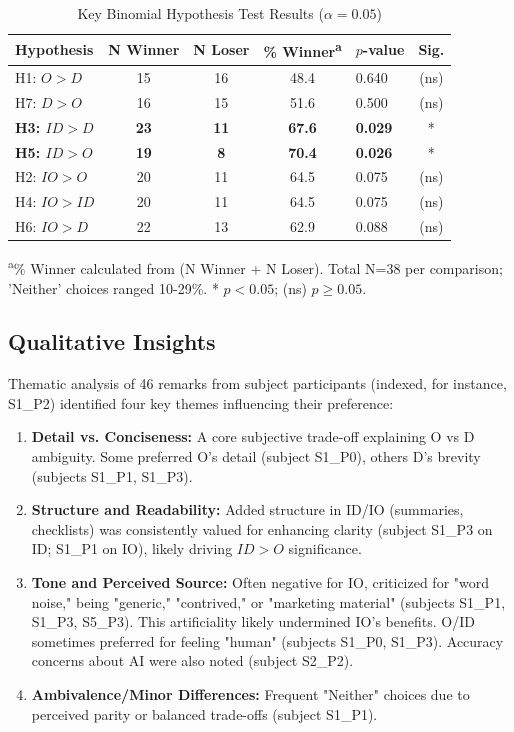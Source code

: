 \documentclass[conference]{IEEEtran}
\begin{document}
\begin{table}[htbp]
    \centering
    \caption{Key Binomial Hypothesis Test Results ($\alpha = 0.05$)}
    \label{tab:hypothesis_results_erv_refined}
    \begin{tabular}{l S[table-format=2.0] S[table-format=2.0] S[table-format=2.1] l c}
        \toprule
        Hypothesis & {N Winner} & {N Loser} & {\% Winner\textsuperscript{a}} & {$p$-value} & {Sig.} \\
        \midrule
        H1: $O > D$   & 15 & 16 & 48.4 & 0.640 & (ns) \\
        H7: $D > O$   & 16 & 15 & 51.6 & 0.500 & (ns) \\
        \textbf{H3: $ID > D$}  & \textbf{23} & \textbf{11} & \textbf{67.6} & \textbf{0.029} & * \\
        \textbf{H5: $ID > O$}  & \textbf{19} & \textbf{8}  & \textbf{70.4} & \textbf{0.026} & * \\
        H2: $IO > O$  & 20 & 11 & 64.5 & 0.075 & (ns) \\
        H4: $IO > ID$ & 20 & 11 & 64.5 & 0.075 & (ns) \\
        H6: $IO > D$  & 22 & 13 & 62.9 & 0.088 & (ns) \\
        \bottomrule
    \end{tabular}
    \textsuperscript{a}\% Winner calculated from (N Winner + N Loser). Total N=38 per comparison; 'Neither' choices ranged 10-29\%. * $p < 0.05$; (ns) $p \ge 0.05$. 
\end{table}

\subsection{Qualitative Insights} %
Thematic analysis of 46 remarks from subject participants (indexed, for instance, S1\_P2) identified four key themes influencing their preference:
\begin{enumerate}
    \item \textbf{Detail vs. Conciseness:} A core subjective trade-off explaining O vs D ambiguity. Some preferred O's detail (subject S1\_P0), others D's brevity (subjects S1\_P1, S1\_P3).
    \item \textbf{Structure and Readability:} Added structure in ID/IO (summaries, checklists) was consistently valued for enhancing clarity (subject S1\_P3 on ID; S1\_P1 on IO), likely driving $ID > O$ significance.
    \item \textbf{Tone and Perceived Source:} Often negative for IO, criticized for "word noise," being "generic," "contrived," or "marketing material" (subjects S1\_P1, S1\_P3, S5\_P3). This artificiality likely undermined IO's benefits. O/ID sometimes preferred for feeling "human" (subjects S1\_P0, S1\_P3). Accuracy concerns about AI were also noted (subject S2\_P2).
    \item \textbf{Ambivalence/Minor Differences:} Frequent "Neither" choices due to perceived parity or balanced trade-offs (subject S1\_P1).
\end{enumerate}
\end{document}
